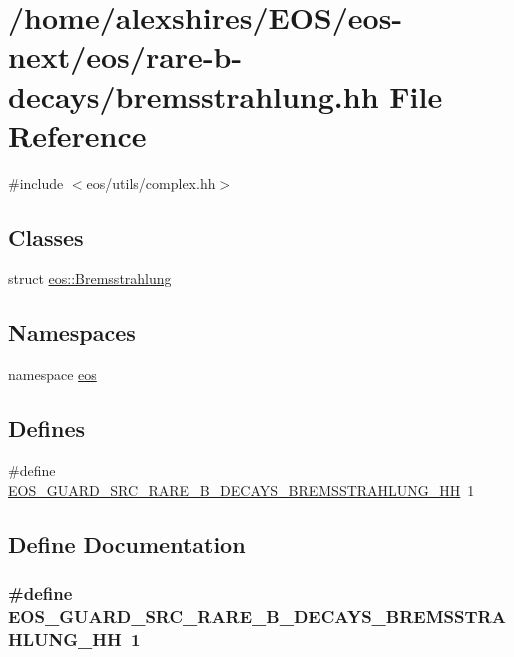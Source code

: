 \hypertarget{bremsstrahlung_8hh}{
\section{/home/alexshires/EOS/eos-\/next/eos/rare-\/b-\/decays/bremsstrahlung.hh File Reference}
\label{bremsstrahlung_8hh}
}
{\ttfamily \#include $<$eos/utils/complex.hh$>$}\par
\subsection*{Classes}
\begin{DoxyCompactItemize}
\item 
struct \hyperlink{structeos_1_1Bremsstrahlung}{eos::Bremsstrahlung}
\end{DoxyCompactItemize}
\subsection*{Namespaces}
\begin{DoxyCompactItemize}
\item 
namespace \hyperlink{namespaceeos}{eos}
\end{DoxyCompactItemize}
\subsection*{Defines}
\begin{DoxyCompactItemize}
\item 
\#define \hyperlink{bremsstrahlung_8hh_a9d74e8157f9ef6e8b95db461d9b08829}{EOS\_\-GUARD\_\-SRC\_\-RARE\_\-B\_\-DECAYS\_\-BREMSSTRAHLUNG\_\-HH}~1
\end{DoxyCompactItemize}


\subsection{Define Documentation}
\hypertarget{bremsstrahlung_8hh_a9d74e8157f9ef6e8b95db461d9b08829}{
\subsubsection[{EOS\_\-GUARD\_\-SRC\_\-RARE\_\-B\_\-DECAYS\_\-BREMSSTRAHLUNG\_\-HH}]{\setlength{\rightskip}{0pt plus 5cm}\#define EOS\_\-GUARD\_\-SRC\_\-RARE\_\-B\_\-DECAYS\_\-BREMSSTRAHLUNG\_\-HH~1}}
\label{bremsstrahlung_8hh_a9d74e8157f9ef6e8b95db461d9b08829}
